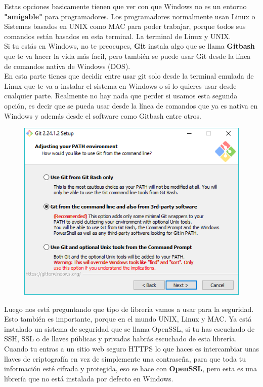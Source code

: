 \documentclass{article}
\begin{document}
\newpage

Estas opciones basicamente tienen que ver con que Windows no es un entorno
\textbf{"amigable"} para programadores. Los programadores normalmente usan
Linux o Sistemas basados en UNIX como MAC para poder trabajar, porque todos sus
comandos están basados en esta terminal. La terminal de Linux y UNIX.\\

Si tu estás en Windows, no te preocupes, \textbf{Git} instala algo que se llama
\textbf{Gitbash} que te va hacer la vida más facil, pero también se puede usar
Git desde la línea de comandos nativa de Windows (DOS).\\

En esta parte tienes que decidir entre usar git solo desde la terminal emulada
de Linux que te va a instalar el sistema en Windows o si lo quieres usar desde
cualquier parte. Realmente no hay nada que perder si usamos esta segunda
opción, es decir que se pueda usar desde la línea de comandos que ya es nativa
en Windows y además desde el software como Gitbash entre otros.

\begin{figure}[h!]
  \centering
  \includegraphics[scale=0.65]{./Pictures/017_install_git.png}
\end{figure}

Luego nos está preguntando que tipo de librería vamos a usar para la seguridad.
Esto también es importante, porque en el mundo UNIX, Linux y MAC. Ya está
instalado un sistema de seguridad que se llama OpenSSL, si tu has escuchado de
SSH, SSL o de llaves públicas y privadas habrás escuchado de esta librería.
Cuando tu entras a un sitio web seguro HTTPS lo que haces es intercambiar unas
llaves de criptografía en vez de simplemente una contraseña, para que toda tu
información esté cifrada y protegida, eso se hace con \textbf{OpenSSL}, pero
esta es una librería que no está instalada por defecto en Windows.\\
\end{document}
